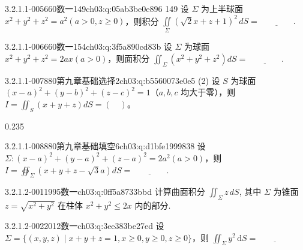 \begin{q}{3.2.1.1-005}{660数一149}{ch03:q:05ab3be0e896}
149 设 $\Sigma$ 为上半球面 $x^2+y^2+z^2=a^2(a>0,z\geq 0)$，则积分 $\displaystyle \iint\limits_{\Sigma}(\sqrt{2}x+z+1)^2\,dS=\underline{\hspace{4em}}.$
\end{q}

\begin{q}{3.2.1.1-006}{660数一154}{ch03:q:3f5a890cd83b}
设 $\Sigma$ 为球面 $x^2+y^2+z^2=2ax(a>0)$，则面积分 $\displaystyle \iint_{\Sigma}(x^2+y^2+z^2)dS=\underline{\hspace{4em}}$.
\end{q}

\begin{q}{3.2.1.1-007}{880第九章基础选择2}{ch03:q:b5560073e0e5}
(2) 设 $S$ 为球面 $(x-a)^2+(y-b)^2+(z-c)^2=1$（$a,b,c$ 均大于零），则 $\displaystyle I=\iint_S (x+y+z)dS=(\quad)$。
\begin{opts}{0.235}
\hfill{}\hfill{}\hfill{}
\end{opts}
\end{q}

\begin{q}{3.2.1.1-008}{880第九章基础填空6}{ch03:q:d1bfe1999838}
设 $\Sigma:(x-a)^2+(y-a)^2+(z-a)^2=2a^2(a>0)$，则 $I=\oiint_{\Sigma}(x+y+z-\sqrt{3}a)dS=\underline{\hspace{4em}}.$
\end{q}

\par\addvspace{2.4ex}\noindent
\begin{minipage}{\linewidth}

\begin{q}{3.2.1.2-001}{1995数一}{ch03:q:0ff5a8733bbd}
计算曲面积分 $\displaystyle \iint_{\Sigma} z\,dS$, 其中 $\Sigma$ 为锥面 $z=\sqrt{x^{2}+y^{2}}$ 在柱体 $x^{2}+y^{2}\leq 2x$ 内的部分.
\end{q}
\end{minipage}


\begin{q}{3.2.1.2-002}{2012数一}{ch03:q:3ee383be27ed}
设 $\Sigma = \{(x,y,z) \mid x+y+z=1, x\ge 0, y\ge 0, z\ge 0\}$，则
$\displaystyle \iint_{\Sigma} y^2 \,\mathrm{d}S = \underline{\hspace{4em}}$
\end{q}

